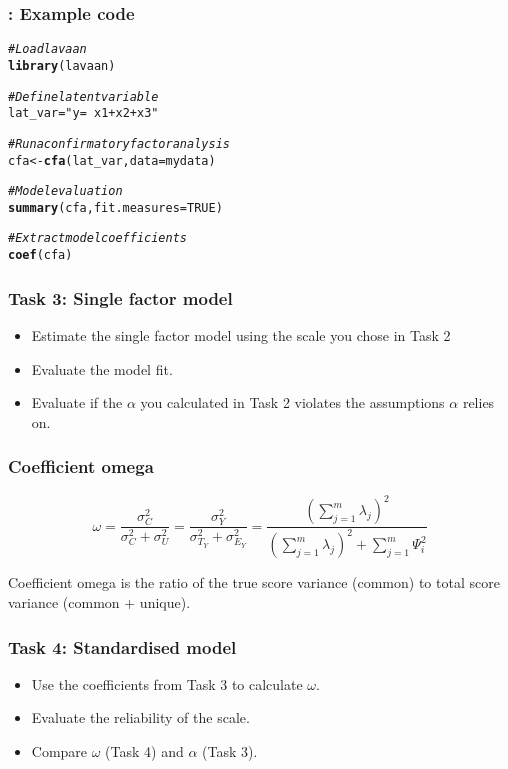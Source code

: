 \documentclass[compress]{beamer}\usepackage[]{graphicx}\usepackage[]{xcolor}
\makeatletter
\newcommand{\hlnum}[1]{\textcolor[rgb]{0.686,0.059,0.569}{#1}}%
\newcommand{\hlstr}[1]{\textcolor[rgb]{0.192,0.494,0.8}{#1}}%
\newcommand{\hlcom}[1]{\textcolor[rgb]{0.678,0.584,0.686}{\textit{#1}}}%
\newcommand{\hlstd}[1]{\textcolor[rgb]{0.345,0.345,0.345}{#1}}%
\newcommand{\hlkwb}[1]{\textcolor[rgb]{0.69,0.353,0.396}{#1}}%
\newcommand{\hlkwc}[1]{\textcolor[rgb]{0.333,0.667,0.333}{#1}}%
\newcommand{\hlkwd}[1]{\textcolor[rgb]{0.737,0.353,0.396}{\textbf{#1}}}%
\newenvironment{kframe}{%
 \def\at@end@of@kframe{}%
 \ifinner\ifhmode%
  \def\at@end@of@kframe{\end{minipage}}%
  \begin{minipage}{\columnwidth}%
 \fi\fi%
 \def\FrameCommand##1{\hskip\@totalleftmargin \hskip-\fboxsep
 \colorbox{shadecolor}{##1}\hskip-\fboxsep
     \hskip-\linewidth \hskip-\@totalleftmargin \hskip\columnwidth}%
 \MakeFramed {\advance\hsize-\width
   \@totalleftmargin\z@ \linewidth\hsize
   \@setminipage}}%
 {\par\unskip\endMakeFramed%
 \at@end@of@kframe}
\newenvironment{knitrout}{}{} %
\makeatother
\begin{document}
\begin{frame}[fragile]
	\frametitle{: Example code}
\begin{knitrout}
\color{fgcolor}\begin{kframe}
\begin{alltt}
        \hlcom{# Load lavaan}
        \hlkwd{library}\hlstd{(lavaan)}

        \hlcom{# Define latent variable}
        \hlstd{lat_var} \hlkwb{=} \hlstr{" y =~ x1 + x2 + x3 "}

        \hlcom{# Run a confirmatory factor analysis}
        \hlstd{cfa} \hlkwb{<-} \hlkwd{cfa}\hlstd{(lat_var,} \hlkwc{data} \hlstd{= mydata)}

        \hlcom{# Model evaluation}
        \hlkwd{summary}\hlstd{(cfa,} \hlkwc{fit.measures} \hlstd{=} \hlnum{TRUE}\hlstd{)}

        \hlcom{# Extract model coefficients}
        \hlkwd{coef}\hlstd{(cfa)}
\end{alltt}
\end{kframe}
\end{knitrout}
\end{frame}


\begin{frame}[fragile]
	\frametitle{Task 3: Single factor model}
		\begin{itemize}
			\item Estimate the single factor model using the scale you chose in Task 2
			\item Evaluate the model fit.
			\item Evaluate if the $\alpha$ you calculated in Task 2 violates the assumptions $\alpha$ relies on.
		\end{itemize}
\end{frame}

\begin{frame}[fragile]
	\frametitle{Coefficient omega}
		\[ \omega = \frac{\sigma_C^2}{\sigma_C^2 + \sigma_U^2} = \frac{\sigma_Y^2}{\sigma_{T_Y}^2 + \sigma_{E_Y}^2} = \frac{\left( \sum_{j=1}^m \lambda_j \right)^2 }{ \left( \sum_{j=1}^m \lambda_j \right)^2 + \sum_{j=1}^m \Psi_i^2 } \]

		Coefficient omega is the ratio of the true score variance (common) to total score variance (common + unique).
	\end{frame}


\begin{frame}[fragile]
	\frametitle{Task 4: Standardised model}
		\begin{itemize}
			\item Use the coefficients from Task 3 to calculate $\omega$.
			\item Evaluate the reliability of the scale.
			\item Compare $\omega$ (Task 4) and $\alpha$ (Task 3).
		\end{itemize}
\end{frame}
\end{document}
